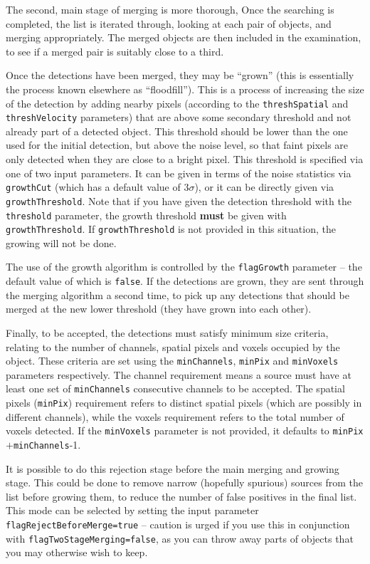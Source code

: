 The second, main stage of merging is more thorough, Once the searching
is completed, the list is iterated through, looking at each pair of
objects, and merging appropriately. The merged objects are then
included in the examination, to see if a merged pair is suitably close
to a third.


Once the detections have been merged, they may be ``grown'' (this is
essentially the process known elsewhere as ``floodfill''). This is a
process of increasing the size of the detection by adding nearby
pixels (according to the \texttt{threshSpatial} and
\texttt{threshVelocity} parameters) that are above some secondary
threshold and not already part of a detected object. This threshold
should be lower than the one used for the initial detection, but above
the noise level, so that faint pixels are only detected when they are
close to a bright pixel. This threshold is specified via one of two
input parameters. It can be given in terms of the noise statistics via
\texttt{growthCut} (which has a default value of $3\sigma$), or it can
be directly given via \texttt{growthThreshold}. Note that if you have
given the detection threshold with the \texttt{threshold} parameter,
the growth threshold \textbf{must} be given with
\texttt{growthThreshold}. If \texttt{growthThreshold} is not provided
in this situation, the growing will not be done.

The use of the growth algorithm is controlled by the
\texttt{flagGrowth} parameter -- the default value of which is
\texttt{false}. If the detections are grown, they are sent through the
merging algorithm a second time, to pick up any detections that should
be merged at the new lower threshold (\ie they have grown into each
other). 

\label{sec-reject}

Finally, to be accepted, the detections must satisfy minimum size
criteria, relating to the number of channels, spatial pixels and
voxels occupied by the object. These criteria are set using the
\texttt{minChannels}, \texttt{minPix} and \texttt{minVoxels}
parameters respectively. The channel requirement means a source must
have at least one set of \texttt{minChannels} consecutive channels to
be accepted. The spatial pixels (\texttt{minPix}) requirement refers
to distinct spatial pixels (which are possibly in different channels),
while the voxels requirement refers to the total number of voxels
detected. If the \texttt{minVoxels} parameter is not provided, it
defaults to \texttt{minPix}$+$\texttt{minChannels}-1.

It is possible to do this rejection stage before the main merging and
growing stage. This could be done to remove narrow (hopefully
spurious) sources from the list before growing them, to reduce the
number of false positives in the final list. This mode can be selected
by setting the input parameter \texttt{flagRejectBeforeMerge=true} --
caution is urged if you use this in conjunction with
\texttt{flagTwoStageMerging=false}, as you can throw away parts of
objects that you may otherwise wish to keep.

